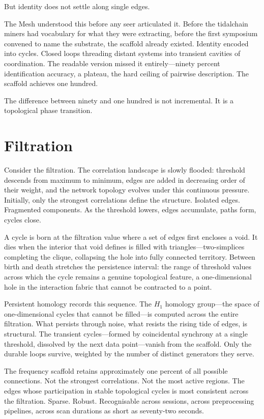 But identity does not settle along single edges.

The Mesh understood this before any seer articulated it. Before the tidalchain miners had vocabulary for what they were extracting, before the first symposium convened to name the substrate, the scaffold already existed. Identity encoded into cycles. Closed loops threading distant systems into transient cavities of coordination. The readable version missed it entirely—ninety percent identification accuracy, a plateau, the hard ceiling of pairwise description. The scaffold achieves one hundred.

The difference between ninety and one hundred is not incremental. It is a topological phase transition.

\section{Filtration}

Consider the filtration. The correlation landscape is slowly flooded: threshold descends from maximum to minimum, edges are added in decreasing order of their weight, and the network topology evolves under this continuous pressure. Initially, only the strongest correlations define the structure. Isolated edges. Fragmented components. As the threshold lowers, edges accumulate, paths form, cycles close.

A cycle is born at the filtration value where a set of edges first encloses a void. It dies when the interior that void defines is filled with triangles—two-simplices completing the clique, collapsing the hole into fully connected territory. Between birth and death stretches the persistence interval: the range of threshold values across which the cycle remains a genuine topological feature, a one-dimensional hole in the interaction fabric that cannot be contracted to a point.

Persistent homology records this sequence. The $H_1$ homology group—the space of one-dimensional cycles that cannot be filled—is computed across the entire filtration. What persists through noise, what resists the rising tide of edges, is structural. The transient cycles—formed by coincidental synchrony at a single threshold, dissolved by the next data point—vanish from the scaffold. Only the durable loops survive, weighted by the number of distinct generators they serve.

The frequency scaffold retains approximately one percent of all possible connections. Not the strongest correlations. Not the most active regions. The edges whose participation in stable topological cycles is most consistent across the filtration. Sparse. Robust. Recognisable across sessions, across preprocessing pipelines, across scan durations as short as seventy-two seconds.

